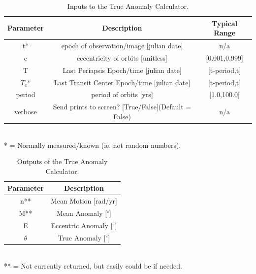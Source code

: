 \documentclass[12pt,preprint]{aastex}
\begin{document}
\begin{table}[h]
\centering
\caption{ Inputs to the True Anomaly Calculator.}
\begin{tabular}{c c c}
\hline\hline
Parameter & Description & Typical Range \\
\hline
t* & epoch of observation/image [julian date] & n/a\\
e & eccentricity of orbits [unitless] & [0.001,0.999]\\
T & Last Periapsis Epoch/time [julian date] & [t-period,t]\\
$T_c$* & Last Transit Center Epoch/time [julian date] & [t-period,t]\\
period & period of orbits [yrs] & [1.0,100.0]\\
verbose & Send prints to screen? [True/False](Default = False) & n/a\\
\hline
\end{tabular}
\\
 * = Normally measured/known (ie. not random numbers).
\end{table}


\begin{table}[h]
\centering
\caption{ Outputs of the True Anomaly Calculator.}
\begin{tabular}{c c}
\hline\hline
Parameter & Description \\
\hline
n** & Mean Motion [rad/yr] \\
M** & Mean Anomaly [$^{\circ}$]\\
E & Eccentric Anomaly [$^{\circ}$]\\
$\theta$ & True Anomaly [$^{\circ}$]\\
\hline
\end{tabular}
\\
 ** = Not currently returned, but easily could be if needed.
\end{table}


\end{document}
